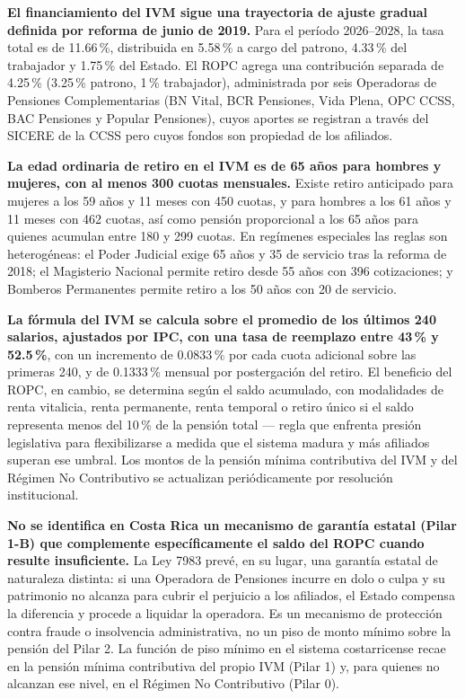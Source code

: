 \documentclass[12pt, letterpaper]{article}
\begin{document}
\textbf{El financiamiento del IVM sigue una trayectoria de ajuste gradual definida por reforma de junio de 2019.} Para el período 2026--2028, la tasa total es de 11.66\,\%, distribuida en 5.58\,\% a cargo del patrono, 4.33\,\% del trabajador y 1.75\,\% del Estado. El ROPC agrega una contribución separada de 4.25\,\% (3.25\,\% patrono, 1\,\% trabajador), administrada por seis Operadoras de Pensiones Complementarias (BN Vital, BCR Pensiones, Vida Plena, OPC CCSS, BAC Pensiones y Popular Pensiones), cuyos aportes se registran a través del SICERE de la CCSS pero cuyos fondos son propiedad de los afiliados.

\textbf{La edad ordinaria de retiro en el IVM es de 65 años para hombres y mujeres, con al menos 300 cuotas mensuales.} Existe retiro anticipado para mujeres a los 59 años y 11 meses con 450 cuotas, y para hombres a los 61 años y 11 meses con 462 cuotas, así como pensión proporcional a los 65 años para quienes acumulan entre 180 y 299 cuotas. En regímenes especiales las reglas son heterogéneas: el Poder Judicial exige 65 años y 35 de servicio tras la reforma de 2018; el Magisterio Nacional permite retiro desde 55 años con 396 cotizaciones; y Bomberos Permanentes permite retiro a los 50 años con 20 de servicio.

\textbf{La fórmula del IVM se calcula sobre el promedio de los últimos 240 salarios, ajustados por IPC, con una tasa de reemplazo entre 43\,\% y 52.5\,\%}, con un incremento de 0.0833\,\% por cada cuota adicional sobre las primeras 240, y de 0.1333\,\% mensual por postergación del retiro. El beneficio del ROPC, en cambio, se determina según el saldo acumulado, con modalidades de renta vitalicia, renta permanente, renta temporal o retiro único si el saldo representa menos del 10\,\% de la pensión total --- regla que enfrenta presión legislativa para flexibilizarse a medida que el sistema madura y más afiliados superan ese umbral. Los montos de la pensión mínima contributiva del IVM y del Régimen No Contributivo se actualizan periódicamente por resolución institucional.

\textbf{No se identifica en Costa Rica un mecanismo de garantía estatal (Pilar 1-B) que complemente específicamente el saldo del ROPC cuando resulte insuficiente.} La Ley 7983 prevé, en su lugar, una garantía estatal de naturaleza distinta: si una Operadora de Pensiones incurre en dolo o culpa y su patrimonio no alcanza para cubrir el perjuicio a los afiliados, el Estado compensa la diferencia y procede a liquidar la operadora. Es un mecanismo de protección contra fraude o insolvencia administrativa, no un piso de monto mínimo sobre la pensión del Pilar 2. La función de piso mínimo en el sistema costarricense recae en la pensión mínima contributiva del propio IVM (Pilar 1) y, para quienes no alcanzan ese nivel, en el Régimen No Contributivo (Pilar 0).
\end{document}
